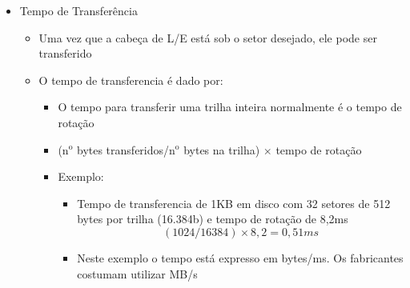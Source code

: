 \documentclass[12pt]{article}
\begin{document}
\begin{itemize}
\begin{itemize}
\begin{itemize}
                de uma rotação (na pratica, esse tempo costima ser menor)
                \item Tambem chamado de Avarage Latency
                \item No inicio dos anos 90, com discos de 3600rpm, a 
                metade do tempo de rotação era de 8,3ms 
                \item Atualmente os discos de 7200rpm tem latencia media 
                de 4,16ms
            \end{itemize}
            \item Em uma leitura/escrita sequencial envolvendo trilhas de 
            um mesmo cilindro, não há latencia na alternânacia entre as 
            trilhas
            \begin{itemize}
                \item Existe apenas um tempo (muito pequeno) de comutação 
                entre as cabe-ças de leitura/escrita
            \end{itemize}
        \end{itemize}
        \item Tempo de Transferência
        \begin{itemize}
            \item Uma vez que a cabeça de L/E está sob o setor desejado, 
            ele pode ser transferido
            \item O tempo de transferencia é dado por:
            \begin{itemize}
                \item O tempo para transferir uma trilha inteira normalmente
                é o tempo de rotação
                \item ($\mathrm{n^o}$ bytes transferidos/$\mathrm{n^o}$ 
                bytes na trilha) $\times$ tempo de rotação
                \item Exemplo: 
                \begin{itemize}
                    \item Tempo de transferencia de 1KB em disco com 
                    32 setores de 512 bytes por trilha (16.384b) e tempo de 
                    rotação de 8,2ms \[(1024/16384) \times 8,2 = 0,51ms\]
                    \item Neste exemplo o tempo está expresso em 
                    bytes/ms. Os fabricantes costumam utilizar MB/s
                \end{itemize}
            \end{itemize}

\end{itemize}
\end{itemize}
\end{document}
